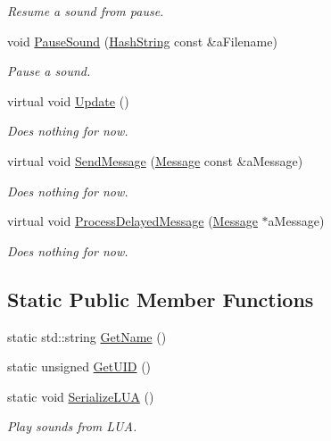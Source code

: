 \begin{DoxyCompactItemize}
\begin{DoxyCompactList}\small\item\em Resume a sound from pause. \end{DoxyCompactList}\item 
void \hyperlink{classSoundManager_a5a27939d574595107d128d740a2c53cc}{Pause\+Sound} (\hyperlink{classHashString}{Hash\+String} const \&a\+Filename)
\begin{DoxyCompactList}\small\item\em Pause a sound. \end{DoxyCompactList}\item 
virtual void \hyperlink{classSoundManager_aaf241621221cdbefeba78e8b6bc29240}{Update} ()
\begin{DoxyCompactList}\small\item\em Does nothing for now. \end{DoxyCompactList}\item 
virtual void \hyperlink{classSoundManager_a71c2d1a4f59afe4fb3c2e2d36110685e}{Send\+Message} (\hyperlink{classMessage}{Message} const \&a\+Message)
\begin{DoxyCompactList}\small\item\em Does nothing for now. \end{DoxyCompactList}\item 
virtual void \hyperlink{classSoundManager_a53d3df2614b23ff7c1b383ae7ca60330}{Process\+Delayed\+Message} (\hyperlink{classMessage}{Message} $\ast$a\+Message)
\begin{DoxyCompactList}\small\item\em Does nothing for now. \end{DoxyCompactList}\end{DoxyCompactItemize}
\subsection*{Static Public Member Functions}
\begin{DoxyCompactItemize}
\item 
static std\+::string \hyperlink{classSoundManager_a96c679d213ececebfde39bb804241ca1}{Get\+Name} ()
\item 
static unsigned \hyperlink{classSoundManager_a8acaba3c30c9fbfcd5f126565185974a}{Get\+U\+ID} ()
\item 
static void \hyperlink{classSoundManager_a438bdd19b49ff2c1af7be591b2264083}{Serialize\+L\+UA} ()
\begin{DoxyCompactList}\small\item\em Play sounds from L\+UA. \end{DoxyCompactList}\end{DoxyCompactItemize}
